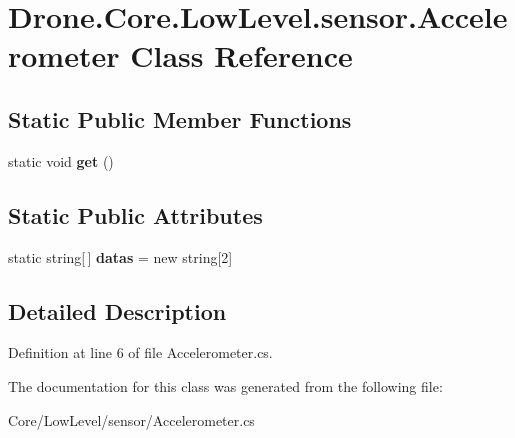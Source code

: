 \hypertarget{class_drone_1_1_core_1_1_low_level_1_1sensor_1_1_accelerometer}{}\section{Drone.\+Core.\+Low\+Level.\+sensor.\+Accelerometer Class Reference}
\label{class_drone_1_1_core_1_1_low_level_1_1sensor_1_1_accelerometer}
\subsection*{Static Public Member Functions}
\begin{DoxyCompactItemize}
\item 
\hypertarget{class_drone_1_1_core_1_1_low_level_1_1sensor_1_1_accelerometer_a8d182f284d9ed684aa11f9dbc2b03b4d}{}static void {\bfseries get} ()\label{class_drone_1_1_core_1_1_low_level_1_1sensor_1_1_accelerometer_a8d182f284d9ed684aa11f9dbc2b03b4d}

\end{DoxyCompactItemize}
\subsection*{Static Public Attributes}
\begin{DoxyCompactItemize}
\item 
\hypertarget{class_drone_1_1_core_1_1_low_level_1_1sensor_1_1_accelerometer_a21bbafa6f77ddf7e192e275f7580811f}{}static string\mbox{[}$\,$\mbox{]} {\bfseries datas} = new string\mbox{[}2\mbox{]}\label{class_drone_1_1_core_1_1_low_level_1_1sensor_1_1_accelerometer_a21bbafa6f77ddf7e192e275f7580811f}

\end{DoxyCompactItemize}


\subsection{Detailed Description}


Definition at line 6 of file Accelerometer.\+cs.



The documentation for this class was generated from the following file\+:\begin{DoxyCompactItemize}
\item 
Core/\+Low\+Level/sensor/Accelerometer.\+cs\end{DoxyCompactItemize}
